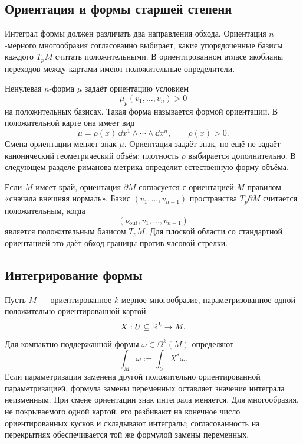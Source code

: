 \subsection{Ориентация и формы старшей степени}

Интеграл формы должен различать два направления обхода. Ориентация \(n\)-мерного многообразия согласованно выбирает, какие упорядоченные базисы каждого \(T_pM\) считать положительными. В ориентированном атласе якобианы переходов между картами имеют положительные определители.

Ненулевая \(n\)-форма \(\mu\) задаёт ориентацию условием
\[
\mu_p(v_1,\ldots,v_n)>0
\]
на положительных базисах. Такая форма называется формой ориентации. В положительной карте она имеет вид
\begin{equation}
\label{eq:orientation-form-local}
\mu=\rho(x)\,\dd x^1\wedge\cdots\wedge\dd x^n,
\qquad
\rho(x)>0.
\end{equation}
Смена ориентации меняет знак \(\mu\). Ориентация задаёт знак, но ещё не задаёт канонический геометрический объём: плотность \(\rho\) выбирается дополнительно. В следующем разделе риманова метрика определит естественную форму объёма.

Если \(M\) имеет край, ориентация \(\partial M\) согласуется с ориентацией \(M\) правилом «сначала внешняя нормаль». Базис \((v_1,\ldots,v_{n-1})\) пространства \(T_p\partial M\) считается положительным, когда
\[
(\nu_{\mathrm{out}},v_1,\ldots,v_{n-1})
\]
является положительным базисом \(T_pM\). Для плоской области со стандартной ориентацией это даёт обход границы против часовой стрелки.

\subsection{Интегрирование формы}

Пусть \(M\) --- ориентированное \(k\)-мерное многообразие, параметризованное одной положительно ориентированной картой
\[
X:U\subseteq\mathbb{R}^k\to M.
\]
Для компактно поддержанной формы \(\omega\in\Omega^k(M)\) определяют
\begin{equation}
\label{eq:form-integral-by-pullback}
\int_M\omega
:=
\int_U X^*\omega.
\end{equation}
Если параметризация заменена другой положительно ориентированной параметризацией, формула замены переменных оставляет значение интеграла неизменным. При смене ориентации знак интеграла меняется. Для многообразия, не покрываемого одной картой, его разбивают на конечное число ориентированных кусков и складывают интегралы; согласованность на перекрытиях обеспечивается той же формулой замены переменных.

